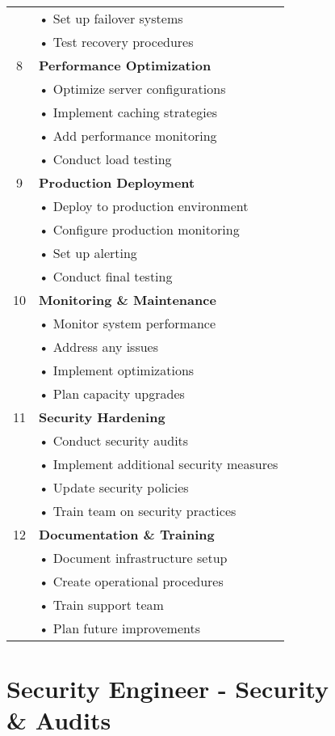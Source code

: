 \documentclass{article}
\begin{document}
\begin{longtable}{|c|p{}|}
& • Set up failover systems\\
& • Test recovery procedures\\
\hline
8 & \textbf{Performance Optimization}\\
& • Optimize server configurations\\
& • Implement caching strategies\\
& • Add performance monitoring\\
& • Conduct load testing\\
\hline
9 & \textbf{Production Deployment}\\
& • Deploy to production environment\\
& • Configure production monitoring\\
& • Set up alerting\\
& • Conduct final testing\\
\hline
10 & \textbf{Monitoring \& Maintenance}\\
& • Monitor system performance\\
& • Address any issues\\
& • Implement optimizations\\
& • Plan capacity upgrades\\
\hline
11 & \textbf{Security Hardening}\\
& • Conduct security audits\\
& • Implement additional security measures\\
& • Update security policies\\
& • Train team on security practices\\
\hline
12 & \textbf{Documentation \& Training}\\
& • Document infrastructure setup\\
& • Create operational procedures\\
& • Train support team\\
& • Plan future improvements\\
\hline
\end{longtable}

\section*{Security Engineer - Security \\& Audits}
\end{document}
